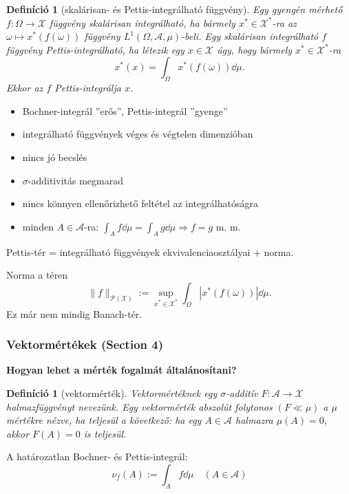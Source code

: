 \documentclass{beamer} %
\newtheorem{defi}[lem]{Definíció}
\begin{document}
\begin{frame}
\justifying
\begin{defi}[skalárisan- és Pettis-integrálható függvény] Egy gyengén mérhető $f \colon \Omega \to \mathcal{X}$ függvény skalárisan integrálható, ha bármely $x^* \in \mathcal{X}^*$-ra az $\omega \mapsto x^*(f(\omega))$ függvény $L^1(\Omega, \mathcal{A},\mu)$-beli. \pause Egy skalárisan integrálható $f$ függvény Pettis-integrálható, ha létezik egy $x \in \mathcal{X}$ úgy, hogy bármely $x^* \in \mathcal{X}^*$-ra
$$x^*(x) = \int_{\Omega} x^*(f(\omega))\dd{\mu}.$$
Ekkor az $f$ Pettis-integrálja $x$.
\end{defi}
\begin{itemize}
\pause \item Bochner-integrál ''erős'', Pettis-integrál ''gyenge''
\pause \item integrálható függvények véges és végtelen dimenzióban
\end{itemize}
\end{frame}

\begin{frame}
\justifying
\begin{itemize}
\item nincs jó becslés
\pause \item $\sigma$-additivitás megmarad
\pause \item nincs könnyen ellenőrizhető feltétel az integrálhatóságra
\pause \item minden $A \in \mathcal{A}$-ra: $\int_{A} f \dd{\mu} = \int_{A} g \dd{\mu} \Longrightarrow f = g$ m. m.
\end{itemize}
\pause Pettis-tér = integrálható függvények ekvivalenciaosztályai + norma.

Norma a téren 
$$
\|f\|_{\mathcal{P}(\mathcal{X})} := \sup_{x^* \in \mathcal{X}^*} \int_{\Omega} | x^*(f(\omega)) | \dd{\mu}.
$$
\pause Ez már nem mindig Banach-tér.
\end{frame}

\begin{frame}
\justifying
\frametitle{Vektormértékek (Section 4)}
\textbf{Hogyan lehet a mérték fogalmát általánosítani?}
\pause \begin{defi}[vektormérték]Vektormértéknek egy $\sigma$-additív  $F \colon \mathcal{A} \to \mathcal{X}$ halmazfüggvényt nevezünk. \pause Egy vektormérték abszolút folytonos $(F \ll \mu)$ a $\mu$ mértékre nézve, ha teljesül a következő: ha egy $A \in \mathcal{A}$ halmazra $\mu(A) = 0$, akkor $F(A)=0$ is teljesül.
\end{defi}
\pause A határozatlan Bochner- és Pettis-integrál:
$$\nu_f(A) := \int_{A} f \dd{\mu} \quad (A \in \mathcal{A})$$
\end{frame}
\end{document}
